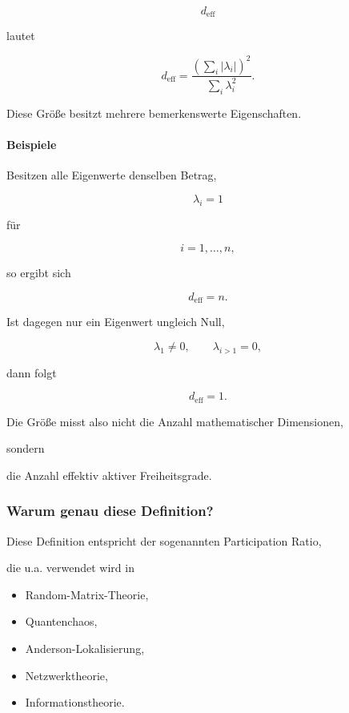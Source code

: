\[
d_{\mathrm{eff}}
\]

lautet

\[
\boxed{
d_{\mathrm{eff}}
=
\frac{\left(\sum_i |\lambda_i|\right)^2}
{\sum_i\lambda_i^2}.
}
\]

Diese Größe besitzt mehrere bemerkenswerte Eigenschaften.


\paragraph{Beispiele}

Besitzen alle Eigenwerte denselben Betrag,

\[
\lambda_i=1
\]

für

\[
i=1,\ldots,n,
\]

so ergibt sich

\[
d_{\mathrm{eff}}
=
n.
\]


Ist dagegen nur ein Eigenwert ungleich Null,

\[
\lambda_1\neq0,
\qquad
\lambda_{i>1}=0,
\]

dann folgt

\[
d_{\mathrm{eff}}
=
1.
\]


Die Größe misst also nicht die Anzahl mathematischer Dimensionen,

sondern

\begin{center}
die Anzahl effektiv aktiver Freiheitsgrade.
\end{center}


\subsubsection*{Warum genau diese Definition?}

Diese Definition entspricht der sogenannten Participation Ratio,

die u.a. verwendet wird in

\begin{itemize}
\item Random-Matrix-Theorie,
\item Quantenchaos,
\item Anderson-Lokalisierung,
\item Netzwerktheorie,
\item Informationstheorie.
\end{itemize}

